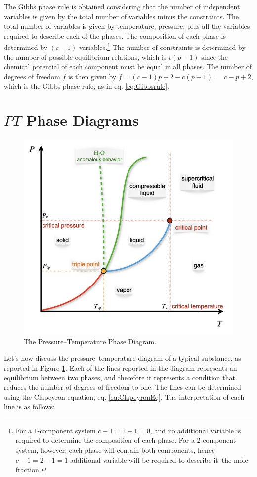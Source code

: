 \documentclass[
  9pt,
]{extbook}
\theoremstyle{definition}
\theoremstyle{definition}
\theoremstyle{definition}
\theoremstyle{definition}
\theoremstyle{remark}
\begin{document}
The Gibbs phase rule is obtained considering that the number of independent variables is given by the total number of variables minus the constraints. The total number of variables is given by temperature, pressure, plus all the variables required to describe each of the phases. The composition of each phase is determined by \((c-1)\) variables.\footnote{For a 1-component system \(c-1=1-1=0\), and no additional variable is required to determine the composition of each phase. For a 2-component system, however, each phase will contain both components, hence \(c-1=2-1=1\) additional variable will be required to describe it--the mole fraction.} The number of constraints is determined by the number of possible equilibrium relations, which is \(c(p-1)\) since the chemical potential of each component must be equal in all phases. The number of degrees of freedom \(f\) is then given by \(f=(c-1)p+2-c(p-1)\) \(=c-p+2\), which is the Gibbs phase rule, as in eq. \eqref{eq:Gibbsrule}.

\section{\texorpdfstring{\(PT\) Phase Diagrams}{PT Phase Diagrams}}\label{pt-phase-diagrams}

\begin{figure}

{\centering \includegraphics[width=0.6\linewidth]{./img/OEP_Figures.018} 

}

\caption{The Pressure–Temperature Phase Diagram.}\label{fig:FigPhase3}
\end{figure}

Let's now discuss the pressure--temperature diagram of a typical substance, as reported in Figure \ref{fig:FigPhase3}. Each of the lines reported in the diagram represents an equilibrium between two phases, and therefore it represents a condition that reduces the number of degrees of freedom to one. The lines can be determined using the Clapeyron equation, eq. \eqref{eq:ClapeyronEq}. The interpretation of each line is as follows:
\end{document}
